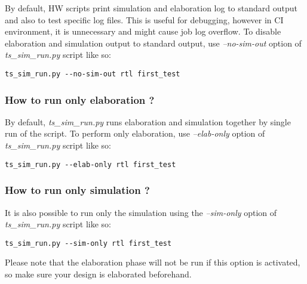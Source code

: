 \documentclass{tropic_design_spec}
\begin{document}
By default, HW scripts print simulation and elaboration log to standard output and also
to test specific log files. This is useful for debugging, however in CI environment,
it is unnecessary and might cause job log overflow. To disable elaboration
and simulation output to standard output, use \textit{--no-sim-out} option
of \textit{ts_sim_run.py} script like so:

\begin{lstlisting}
ts_sim_run.py --no-sim-out rtl first_test
\end{lstlisting}


\subsubsection{How to run only elaboration ?}
\label{sec:how-to-run-only-elaboration}

By default, \textit{ts_sim_run.py} runs elaboration and simulation together by single
run of the script. To perform only elaboration, use \textit{--elab-only} option of
\textit{ts_sim_run.py} script like so:

\begin{lstlisting}
ts_sim_run.py --elab-only rtl first_test
\end{lstlisting}


\subsubsection{How to run only simulation ?}
\label{sec:how-to-run-only-simulation}

It is also possible to run only the simulation using the \textit{--sim-only} option of
\textit{ts_sim_run.py} script like so:

\begin{lstlisting}
ts_sim_run.py --sim-only rtl first_test
\end{lstlisting}

Please note that the elaboration phase will not be run if this option is activated, so
make sure your design is elaborated beforehand.


\end{document}
